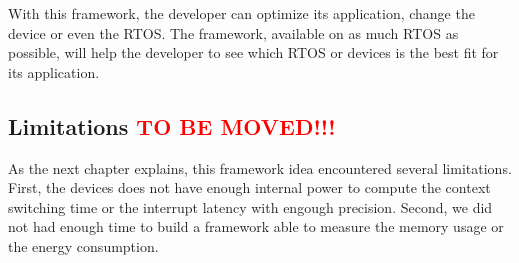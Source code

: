With this framework, the developer can optimize its application, change the device or even the RTOS.
The framework, available on as much RTOS as possible, will help the developer to see which RTOS or devices is the best fit for its application.

\subsection{Limitations \textcolor{red}{TO BE MOVED!!!}}
As the next chapter explains, this framework idea encountered several limitations.
First, the devices does not have enough internal power to compute the context switching time or the interrupt latency with engough precision.
Second, we did not had enough time to build a framework able to measure the memory usage or the energy consumption.